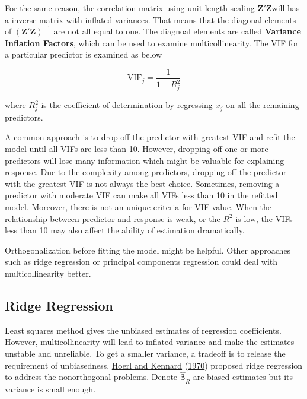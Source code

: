 \documentclass[
  11pt,
  openany]{memoir}
\begin{document}
For the same reason, the correlation matrix using unit length scaling \(\mathbf{Z'Z}\)will has a inverse matrix with inflated variances. That means that the diagonal elements of \((\mathbf{Z'Z})^{-1}\) are not all equal to one. The diagnoal elements are called \textbf{Variance Inflation Factors}, which can be used to examine multicollinearity. The VIF for a particular predictor is examined as below

\begin{equation}
\mathrm{VIF}_j=\frac{1}{1-R_j^2}
\label{eq:vif}
\end{equation}

where \(R_j^2\) is the coefficient of determination by regressing \(x_j\) on all the remaining predictors.

A common approach is to drop off the predictor with greatest VIF and refit the model until all VIFs are less than 10. However, dropping off one or more predictors will lose many information which might be valuable for explaining response. Due to the complexity among predictors, dropping off the predictor with the greatest VIF is not always the best choice. Sometimes, removing a predictor with moderate VIF can make all VIFs less than 10 in the refitted model. Moreover, there is not an unique criteria for VIF value. When the relationship between predictor and response is weak, or the \(R^2\) is low, the VIFs less than 10 may also affect the ability of estimation dramatically.

Orthogonalization before fitting the model might be helpful. Other approaches such as ridge regression or principal components regression could deal with multicollinearity better.

\hypertarget{ridge-regression}{%
\subsection{Ridge Regression}\label{ridge-regression}}

Least squares method gives the unbiased estimates of regression coefficients.
However, multicollinearity will lead to inflated variance and make the estimates unstable and unreliable.
To get a smaller variance, a tradeoff is to release the requirement of unbiasedness.
\protect\hyperlink{ref-hoerlRidgeRegressionBiased1970}{Hoerl and Kennard} (\protect\hyperlink{ref-hoerlRidgeRegressionBiased1970}{1970}) proposed ridge regression to address the nonorthogonal problems.
Denote \(\boldsymbol{\hat\beta}_{R}\) are biased estimates but its variance is small enough.
\end{document}
